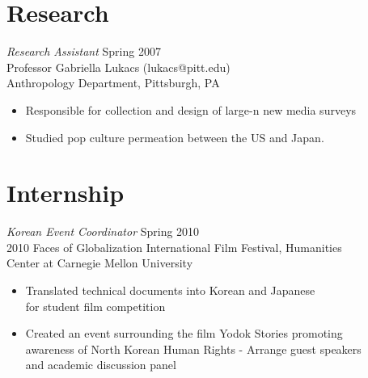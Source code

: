 \documentclass[margin]{res}
\begin{document}
\begin{resume}
\section{Research} {\sl Research Assistant} \hfill Spring 2007 \\
                Professor Gabriella Lukacs (lukacs@pitt.edu) \\
                Anthropology Department, Pittsburgh, PA 
                 \begin{itemize}  \itemsep -2pt %
                 \item Responsible for collection and design of large-n new media surveys
                \item  Studied pop culture permeation between the US and Japan. 
                \end{itemize}
 
  \section{Internship} {\sl Korean Event Coordinator} \hfill Spring 2010\\
                2010 Faces of Globalization International Film Festival, Humanities\\ 
                Center at Carnegie Mellon University
                 \begin{itemize}  \itemsep -2pt %
                 \item Translated technical documents into Korean and Japanese\\ 
                 for student film competition
                 \item Created an event surrounding the film Yodok Stories promoting\\ 
                 awareness of North Korean Human Rights  - Arrange guest speakers\\
                  and academic discussion panel
                 \end{itemize} 

\end{resume}
\end{document}
